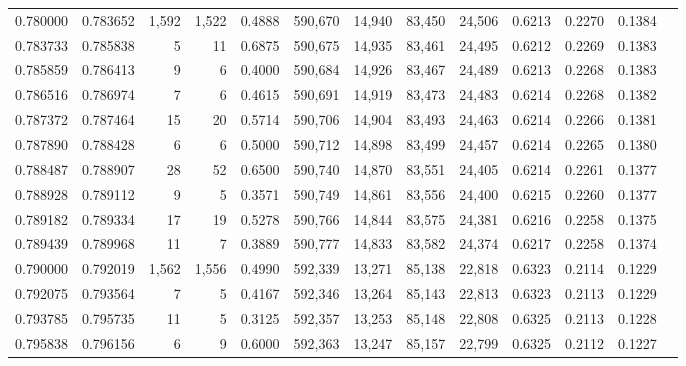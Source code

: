 \begin{tabular}{rrrrrrrrrrrrr}
0.780000 & 0.783652 &  1,592 & 1,522 &                                     0.4888 & 590,670 &  14,940 &  83,450 &  24,506 & 0.6213 & 0.2270 & 0.1384 \\
0.783733 & 0.785838 &      5 &    11 &                                     0.6875 & 590,675 &  14,935 &  83,461 &  24,495 & 0.6212 & 0.2269 & 0.1383 \\
0.785859 & 0.786413 &      9 &     6 &                                     0.4000 & 590,684 &  14,926 &  83,467 &  24,489 & 0.6213 & 0.2268 & 0.1383 \\
0.786516 & 0.786974 &      7 &     6 &                                     0.4615 & 590,691 &  14,919 &  83,473 &  24,483 & 0.6214 & 0.2268 & 0.1382 \\
0.787372 & 0.787464 &     15 &    20 &                                     0.5714 & 590,706 &  14,904 &  83,493 &  24,463 & 0.6214 & 0.2266 & 0.1381 \\
0.787890 & 0.788428 &      6 &     6 &                                     0.5000 & 590,712 &  14,898 &  83,499 &  24,457 & 0.6214 & 0.2265 & 0.1380 \\
0.788487 & 0.788907 &     28 &    52 &                                     0.6500 & 590,740 &  14,870 &  83,551 &  24,405 & 0.6214 & 0.2261 & 0.1377 \\
0.788928 & 0.789112 &      9 &     5 &                                     0.3571 & 590,749 &  14,861 &  83,556 &  24,400 & 0.6215 & 0.2260 & 0.1377 \\
0.789182 & 0.789334 &     17 &    19 &                                     0.5278 & 590,766 &  14,844 &  83,575 &  24,381 & 0.6216 & 0.2258 & 0.1375 \\
0.789439 & 0.789968 &     11 &     7 &                                     0.3889 & 590,777 &  14,833 &  83,582 &  24,374 & 0.6217 & 0.2258 & 0.1374 \\
0.790000 & 0.792019 &  1,562 & 1,556 &                                     0.4990 & 592,339 &  13,271 &  85,138 &  22,818 & 0.6323 & 0.2114 & 0.1229 \\
0.792075 & 0.793564 &      7 &     5 &                                     0.4167 & 592,346 &  13,264 &  85,143 &  22,813 & 0.6323 & 0.2113 & 0.1229 \\
0.793785 & 0.795735 &     11 &     5 &                                     0.3125 & 592,357 &  13,253 &  85,148 &  22,808 & 0.6325 & 0.2113 & 0.1228 \\
0.795838 & 0.796156 &      6 &     9 &                                     0.6000 & 592,363 &  13,247 &  85,157 &  22,799 & 0.6325 & 0.2112 & 0.1227 \\

\end{tabular}
